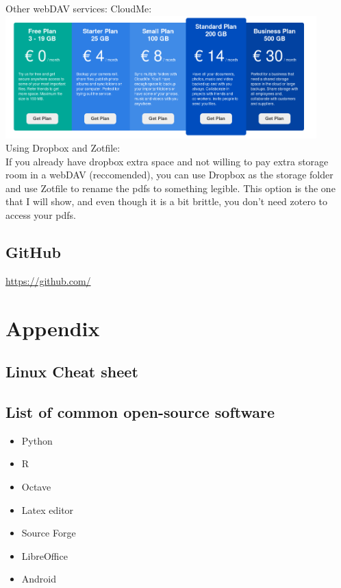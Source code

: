\documentclass[a4paper]{article}
\begin{document}
Other webDAV services: CloudMe:\\
\includegraphics[width=0.9\textwidth]{zotero_price_cloudme.png}\\

Using Dropbox and Zotfile:\\
If you already have dropbox extra space and not willing to pay extra storage room in a webDAV (reccomended), you can use Dropbox as the storage folder and use Zotfile to rename the pdfs to something legible. This option is the one that I will show, and even though it is a bit brittle, you don't need zotero to access your pdfs.

\subsection{GitHub}
\url{https://github.com/}
\section*{Appendix}
\subsection{Linux Cheat sheet}
\subsection{List of common open-source software} 
\begin{itemize}
\item Python %
\item R %
\item Octave 
\item Latex editor
\item Source Forge
\item LibreOffice
\item Android
\end{itemize}

\newpage
\end{document}
